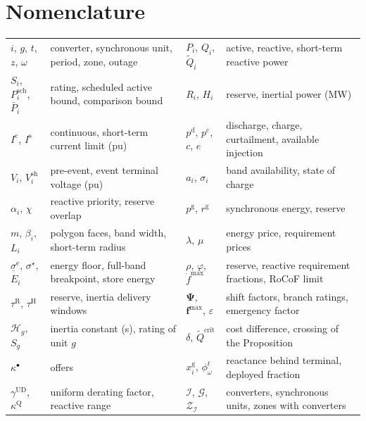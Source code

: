 \documentclass[final,5p,times,twocolumn]{elsarticle}
\begin{document}
\begin{table}[t]
  \section*{Nomenclature}
  \centering
  \small
  \begin{tabular*}{\textwidth}{@{\extracolsep{\fill}}l l l l@{}}
    \toprule
    $i$, $g$, $t$, $z$, $\omega$ & converter, synchronous unit, period, zone,
      outage
      & $P_i$, $Q_i$, $\tilde{Q}_i$ & active, reactive, short-term reactive
      power \\
    $S_i$, $P^{\mathrm{sch}}_i$, $\bar{P}_i$ & rating, scheduled active
      bound, comparison bound
      & $R_i$, $H_i$ & reserve, inertial power (MW) \\
    $I^{\mathrm{c}}$, $I^{\mathrm{s}}$ & continuous, short-term current limit
      (pu)
      & $p^{\mathrm{d}}$, $p^{\mathrm{c}}$, $c$, $e$ & discharge, charge,
      curtailment, available injection \\
    $V_i$, $V^{\mathrm{sh}}_i$ & pre-event, event terminal voltage (pu)
      & $a_i$, $\sigma_i$ & band availability, state of charge \\
    $\alpha_i$, $\chi$ & reactive priority, reserve overlap
      & $p^{\mathrm{g}}$, $r^{\mathrm{g}}$ & synchronous energy, reserve \\
    $m$, $\beta_i$, $L_i$ & polygon faces, band width, short-term radius
      & $\lambda$, $\mu$ & energy price, requirement prices \\
    $\underline{\sigma}^{\mathrm{e}}$, $\sigma^{\star}$, $E_i$ & energy
      floor, full-band breakpoint, store energy
      & $\rho$, $\varphi$, $\dot{f}^{\max}$ & reserve, reactive requirement
      fractions, RoCoF limit \\
    $\tau^{\mathrm{R}}$, $\tau^{\mathrm{H}}$ & reserve, inertia delivery
      windows
      & $\boldsymbol{\Psi}$, $\mathbf{f}^{\max}$, $\varepsilon$ & shift
      factors, branch ratings, emergency factor \\
    $\mathcal{H}_g$, $S_g$ & inertia constant (s), rating of unit $g$
      & $\delta$, $\tilde{Q}^{\mathrm{crit}}$ & cost difference, crossing of
      the Proposition \\
    $\kappa^{\bullet}$ & offers
      & $x^{\mathrm{g}}_i$, $\phi^t_\omega$ & reactance behind terminal,
      deployed fraction \\
    $\gamma^{\mathrm{UD}}$, $\kappa^{\mathrm{Q}}$ & uniform derating factor,
      reactive range
      & $\mathcal{I}$, $\mathcal{G}$, $\mathcal{Z}_{\mathcal{I}}$ & converters,
      synchronous units, zones with converters \\
    \bottomrule
  \end{tabular*}
\end{table}
\end{document}
